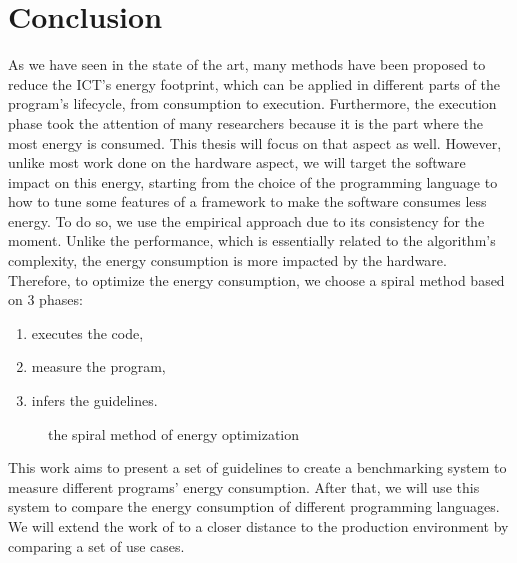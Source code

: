 \section{Conclusion}
As we have seen in the state of the art, many methods have been proposed to reduce the ICT's energy footprint, which can be applied in different parts of the program's lifecycle, from consumption to execution.
Furthermore, the execution phase took the attention of many researchers because it is the part where the most energy is consumed.
This thesis will focus on that aspect as well.
However, unlike most work done on the hardware aspect, we will target the software impact on this energy, starting from the choice of the programming language to how to tune some features of a framework to make the software consumes less energy.
To do so, we use the empirical approach due to its consistency for the moment.
Unlike the performance, which is essentially related to the algorithm's complexity, the energy consumption is more impacted by the hardware.
Therefore, to optimize the energy consumption, we choose a spiral method based on 3 phases:
\begin{enumerate}
    \item executes the code,
    \item measure the program,
    \item infers the guidelines.
\end{enumerate}

\begin{figure}[!hbt]
    \caption{the spiral method of energy optimization }\label{fig:spirals}
\end{figure}


This work aims to present a set of guidelines to create a benchmarking system to measure different programs' energy consumption.
After that, we will use this system to compare the energy consumption of different programming languages. We will extend the work of \citeauthor{pereira_energy_2017} to a closer distance to the production environment by comparing a set of use cases.

